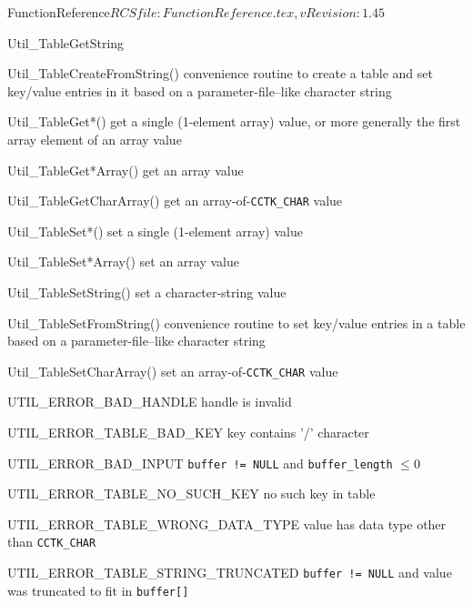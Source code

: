 \begin{cactuspart}{5}{FunctionReference}{$RCSfile: FunctionReference.tex,v $}{$Revision: 1.45 $}
\begin{FunctionDescription}{Util\_TableGetString}
\begin{SeeAlso}{Util\_TableCreateFromString()}
convenience routine to create a table and set key/value entries
in it based on a parameter-file--like character string
\end{SeeAlso}
\begin{SeeAlso}{Util\_TableGet*()}
get a single (1-element array) value,
or more generally the first array element of an array value
\end{SeeAlso}
\begin{SeeAlso}{Util\_TableGet*Array()}
get an array value
\end{SeeAlso}
\begin{SeeAlso}{Util\_TableGetCharArray()}
get an array-of-\verb|CCTK_CHAR| value
\end{SeeAlso}
\begin{SeeAlso}{Util\_TableSet*()}
set a single (1-element array) value
\end{SeeAlso}
\begin{SeeAlso}{Util\_TableSet*Array()}
set an array value
\end{SeeAlso}
\begin{SeeAlso}{Util\_TableSetString()}
set a character-string value
\end{SeeAlso}
\begin{SeeAlso}{Util\_TableSetFromString()}
convenience routine to set key/value entries in a table based on a
parameter-file--like character string
\end{SeeAlso}
\begin{SeeAlso}{Util\_TableSetCharArray()}
set an array-of-\verb|CCTK_CHAR| value
\end{SeeAlso}

\begin{Error}{UTIL\_ERROR\_BAD\_HANDLE}
handle is invalid
\end{Error}
\begin{Error}{UTIL\_ERROR\_TABLE\_BAD\_KEY}
key contains '/' character
\end{Error}
\begin{Error}{UTIL\_ERROR\_BAD\_INPUT}
\verb|buffer != NULL| and \verb|buffer_length| $\le 0$
\end{Error}
\begin{Error}{UTIL\_ERROR\_TABLE\_NO\_SUCH\_KEY}
no such key in table
\end{Error}
\begin{Error}{UTIL\_ERROR\_TABLE\_WRONG\_DATA\_TYPE}
value has data type other than \verb|CCTK_CHAR|
\end{Error}
\begin{Error}{UTIL\_ERROR\_TABLE\_STRING\_TRUNCATED}
\quad
\verb|buffer != NULL| and value was truncated to fit in \verb|buffer[]|
\end{Error}


\end{FunctionDescription}
\end{cactuspart}
